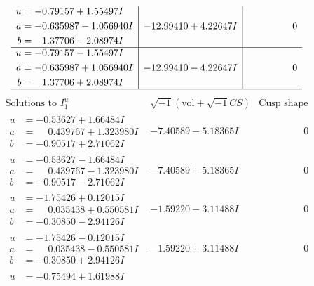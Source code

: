 \documentclass[1p]{elsarticle_modified}
\theoremstyle{definition}
\newcommand{\I}{\sqrt{-1}}
\begin{document}
$$\begin{array}{c|c|c}
\begin{aligned}
u &= -0.79157 + 1.55497 I \\
a &= -0.635987 - 1.056940 I \\
b &= \phantom{-}1.37706 - 2.08974 I\end{aligned}
 & -12.99410 + 4.22647 I & \phantom{-0.000000 } 0 \\ \hline\begin{aligned}
u &= -0.79157 - 1.55497 I \\
a &= -0.635987 + 1.056940 I \\
b &= \phantom{-}1.37706 + 2.08974 I\end{aligned}
 & -12.99410 - 4.22647 I & \phantom{-0.000000 } 0\\
 \hline 
 \end{array}$$\newpage$$\begin{array}{c|c|c}  
\text{Solutions to }I^u_{1}& \I (\text{vol} + \sqrt{-1}CS) & \text{Cusp shape}\\
 \hline 
\begin{aligned}
u &= -0.53627 + 1.66484 I \\
a &= \phantom{-}0.439767 + 1.323980 I \\
b &= -0.90517 + 2.71062 I\end{aligned}
 & -7.40589 - 5.18365 I & \phantom{-0.000000 } 0 \\ \hline\begin{aligned}
u &= -0.53627 - 1.66484 I \\
a &= \phantom{-}0.439767 - 1.323980 I \\
b &= -0.90517 - 2.71062 I\end{aligned}
 & -7.40589 + 5.18365 I & \phantom{-0.000000 } 0 \\ \hline\begin{aligned}
u &= -1.75426 + 0.12015 I \\
a &= \phantom{-}0.035438 + 0.550581 I \\
b &= -0.30850 - 2.94126 I\end{aligned}
 & -1.59220 - 3.11488 I & \phantom{-0.000000 } 0 \\ \hline\begin{aligned}
u &= -1.75426 - 0.12015 I \\
a &= \phantom{-}0.035438 - 0.550581 I \\
b &= -0.30850 + 2.94126 I\end{aligned}
 & -1.59220 + 3.11488 I & \phantom{-0.000000 } 0 \\ \hline\begin{aligned}
u &= -0.75494 + 1.61988 I \\

\end{aligned}
\end{array}$$
\end{document}
